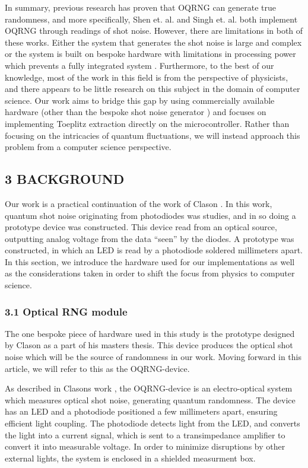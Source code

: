 In summary, previous research has proven that OQRNG can generate true randomness, and more specifically, Shen et. al. \cite{contender1} and Singh et. al. \cite{singh} both implement OQRNG through readings of shot noise. However, there are limitations in both of these works. Either the system that generates the shot noise is large and complex \cite{contender1} or the system is built on bespoke hardware with limitations in processing power which prevents a fully integrated system \cite{singh}. Furthermore, to the best of our knowledge, most of the work in this field is from the perspective of physicists, and there appears to be little research on this subject in the domain of computer science. Our work aims to bridge this gap by using commercially available hardware (other than the bespoke shot noise generator \cite{Clason2023}) and focuses on implementing Toeplitz extraction directly on the microcontroller. Rather than focusing on the intricacies of quantum fluctuations, we will instead approach this problem from a computer science perspective.

\subsection{3 BACKGROUND}\label{background}

Our work is a practical continuation of the work of Clason \cite{Clason2023}. In this work, quantum shot noise originating from photodiodes was studies, and in so doing a prototype device was constructed. This device read from an optical source, outputting analog voltage from the data ``seen'' by the diodes. A prototype was constructed, in which an LED is read by a photodiode soldered millimeters apart. In this section, we introduce the hardware used for our implementations as well as the considerations taken in order to shift the focus from physics to computer science.

\subsubsection{3.1 Optical RNG module}\label{optical-rng-module}

The one bespoke piece of hardware used in this study is the prototype designed by Clason \cite{Clason2023} as a part of his masters thesis. This device produces the optical shot noise which will be the source of randomness in our work. Moving forward in this article, we will refer to this as the OQRNG-device.

As described in Clasons work \cite{Clason2023}, the OQRNG-device is an electro-optical system which measures optical shot noise, generating quantum randomness. The device has an LED and a photodiode positioned a few millimeters apart, ensuring efficient light coupling. The photodiode detects light from the LED, and converts the light into a current signal, which is sent to a transimpedance amplifier to convert it into measurable voltage. In order to minimize disruptions by other external lights, the system is enclosed in a shielded measurment box.

